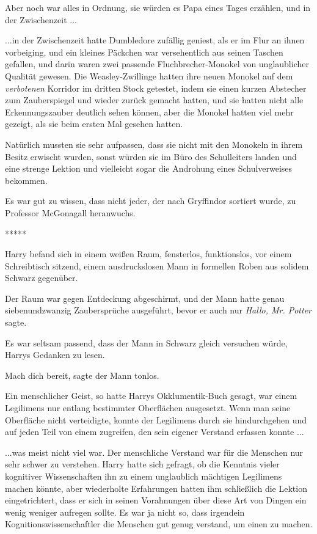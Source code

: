 Aber noch war alles in Ordnung, sie würden es Papa eines Tages erzählen, und in
der Zwischenzeit ...

...in der Zwischenzeit hatte Dumbledore zufällig geniest, als er im Flur an
ihnen vorbeiging, und ein kleines Päckchen war versehentlich aus seinen Taschen
gefallen, und darin waren zwei passende Fluchbrecher-Monokel von unglaublicher
Qualität gewesen. Die Weasley-Zwillinge hatten ihre neuen Monokel auf dem
\glqq{} \emph{verbotenen}\grqq{} Korridor im dritten Stock getestet, indem sie
einen kurzen Abstecher zum Zauberspiegel und wieder zurück gemacht hatten, und
sie hatten nicht alle Erkennungszauber deutlich sehen können, aber die Monokel
hatten viel mehr gezeigt, als sie beim ersten Mal gesehen hatten.

Natürlich mussten sie sehr aufpassen, dass sie nicht mit den Monokeln in ihrem
Besitz erwischt wurden, sonst würden sie im Büro des Schulleiters landen und
eine strenge Lektion und vielleicht sogar die Androhung eines Schulverweises
bekommen.

Es war gut zu wissen, dass nicht jeder, der nach Gryffindor sortiert wurde, zu
Professor McGonagall heranwuchs.

\begin{center}*****\end{center}

Harry befand sich in einem weißen Raum, fensterlos, funktionslos, vor einem
Schreibtisch sitzend, einem ausdruckslosen Mann in formellen Roben aus solidem
Schwarz gegenüber.

Der Raum war gegen Entdeckung abgeschirmt, und der Mann hatte genau
siebenundzwanzig Zaubersprüche ausgeführt, bevor er auch nur \emph{\glqq{}
Hallo, Mr. Potter\grqq{}} sagte.

Es war seltsam passend, dass der Mann in Schwarz gleich versuchen würde, Harrys
Gedanken zu lesen.

\glqq{}Mach dich bereit\grqq{}, sagte der Mann tonlos.

Ein menschlicher Geist, so hatte Harrys Okklumentik-Buch gesagt, war einem
Legilimens nur entlang bestimmter Oberflächen ausgesetzt. Wenn man seine
Oberfläche nicht verteidigte, konnte der Legilimens durch sie hindurchgehen und
auf jeden Teil von einem zugreifen, den sein eigener Verstand erfassen konnte ...

...was meist nicht viel war. Der menschliche Verstand war für die Menschen nur
sehr schwer zu verstehen. Harry hatte sich gefragt, ob die Kenntnis vieler
kognitiver Wissenschaften ihn zu einem unglaublich mächtigen Legilimens machen
könnte, aber wiederholte Erfahrungen hatten ihm schließlich die Lektion
eingetrichtert, dass er sich in seinen Vorahnungen über diese Art von Dingen ein
wenig weniger aufregen sollte. Es war ja nicht so, dass irgendein
Kognitionswissenschaftler die Menschen gut genug verstand, um einen zu machen.

